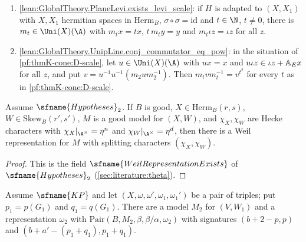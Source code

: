 \begin{enumerate}[resume*=thmKconeD]
  $(X,\omega,\omega',\omega_1,\omega_1')$ be a pair of triples.  If $k\in\Uni(V)(\A)$ satisfies $kx=ax$ for some
  $a\in\thmKconeAE$ and $k\iota z\in\iota z+\thmKconeAE x$ for all $z$, there is $c\in\C$ with
  $e(\omega(k,1)\Psi)=c\,e(\Psi)$ for all test functions $\Psi$.
\item\label{pf:thmK-cone:D-scale} \cref{lean:GlobalTheory.PlaneLevi.exists_levi_scale}: if $H$ is adapted to
  $(X,X_1)$ with $X,X_1$ hermitian spaces in $\mathrm{Herm}_B$, $\sigma\circ\sigma=\mathrm{id}$ and $t\in\N$, $t\neq0$,
  there is $m_t\in\Uni(X)(\A)$ with $m_tx=tx$, $t\,m_ty=y$ and $m_t\iota z=\iota z$ for all $z$.
\item\label{pf:thmK-cone:D-commut} \cref{lean:GlobalTheory.UnipLine.conj_commutator_eq_pow}: in the situation of
  \ref{pf:thmK-cone:D-scale}, let $u\in\Uni(X)(\A)$ with $ux=x$ and $u\iota z\in\iota z+\mathbb{A}_E x$ for all $z$, and
  put $v=u^{-1}u^{-1}(m_2um_2^{-1})$.  Then $m_tvm_t^{-1}=v^{t^2}$ for every $t$ as in \ref{pf:thmK-cone:D-scale}.
\end{enumerate}

\begin{lemma}\label{pf:thmK-cone:weilex}
Assume $\sfname{Hypotheses}_2$.  If $B$ is good, $X\in\mathrm{Herm}_B(r,s)$, $W\in\mathrm{Skew}_B(r',s')$, $M$ is a good
model for $(X,W)$, and $\chi_X,\chi_W$ are Hecke characters with $\chi_X|_{\A^\times}=\eta^n$ and
$\chi_W|_{\A^\times}=\eta^d$, then there is a Weil representation for $M$ with splitting characters $(\chi_X,\chi_W)$.
\end{lemma}

\begin{proof}
This is the field $\sfname{WeilRepresentationExists}$ of $\sfname{Hypotheses}_2$ (\cref{sec:literature:theta}).
\end{proof}

\begin{lemma}\label{pf:thmK-cone:midpair}
Assume $\sfname{KP}$ and let $(X,\omega,\omega',\omega_1,\omega_1')$ be a pair of triples; put $p_1=p(G_1)$ and $q_1=q(G_1)$.
There are a model $M_2$ for $(V,W_1)$ and a representation $\omega_2$ with $\mathrm{Pair}(B,M_2,\beta,\beta/\alpha,\omega_2)$
with signatures $(b+2-p,p)$ and $(b+a'-(p_1+q_1),p_1+q_1)$.
\end{lemma}

